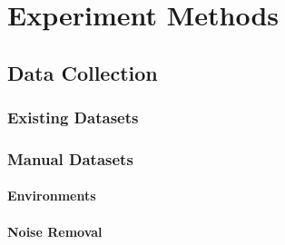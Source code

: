 \chapter{Experiment Methods}
%
%
%
%

\section{Data Collection}

\subsection{Existing Datasets}

\subsection{Manual Datasets}

\subsubsection{Environments}

\subsubsection{Noise Removal}

